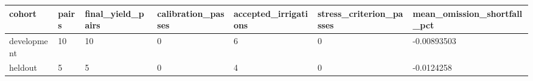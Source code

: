 \begin{tabular}{lllllll}
\hline
cohort & pairs & final\_yield\_pairs & calibration\_passes & accepted\_irrigations & stress\_criterion\_passes & mean\_omission\_shortfall\_pct \\
\hline
development & 10 & 10 & 0 & 6 & 0 & -0.00893503 \\
heldout & 5 & 5 & 0 & 4 & 0 & -0.0124258 \\
\hline
\end{tabular}
